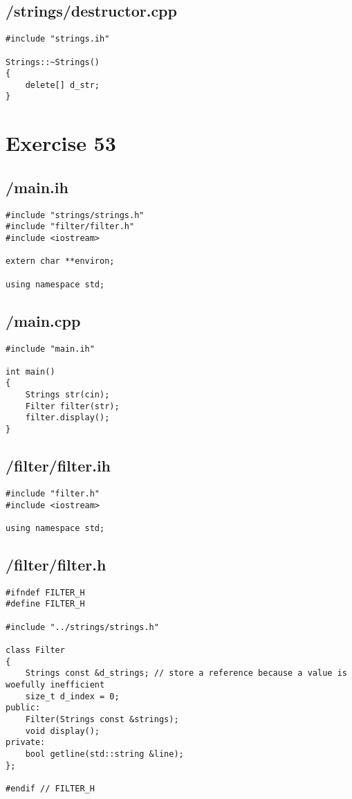 \documentclass{article}
\begin{document}
\subsection*{/strings/destructor.cpp}
\begin{verbatim}
#include "strings.ih"

Strings::~Strings()
{
    delete[] d_str;
}
\end{verbatim}


\section*{Exercise 53}
\subsection*{/main.ih}
\begin{verbatim}
#include "strings/strings.h"
#include "filter/filter.h"
#include <iostream>

extern char **environ;

using namespace std;

\end{verbatim}
\subsection*{/main.cpp}
\begin{verbatim}
#include "main.ih"

int main()
{
    Strings str(cin);
    Filter filter(str);
    filter.display();
}
\end{verbatim}
\subsection*{/filter/filter.ih}
\begin{verbatim}
#include "filter.h"
#include <iostream>

using namespace std;

\end{verbatim}
\subsection*{/filter/filter.h}
\begin{verbatim}
#ifndef FILTER_H
#define FILTER_H

#include "../strings/strings.h"

class Filter 
{
    Strings const &d_strings; // store a reference because a value is woefully inefficient
    size_t d_index = 0;
public:
    Filter(Strings const &strings);
    void display();
private:
    bool getline(std::string &line);
};

#endif // FILTER_H

\end{verbatim}
\end{document}
